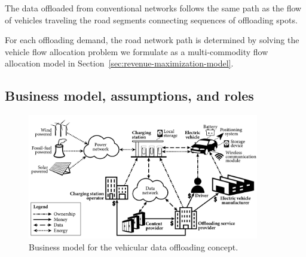 
The data offloaded from conventional networks follows the same path as the flow of vehicles traveling the road segments connecting sequences of offloading spots. 

For each offloading demand, the road network path is determined by solving the vehicle flow allocation problem we formulate as a multi-commodity flow allocation model in Section~\ref{sec:revenue-maximization-model}.




\subsection{Business model, assumptions, and roles}
\label{sec:business-model}

\begin{figure}[h!]
    \centering
    \includegraphics[width=0.9\textwidth]{figures/business-plan.pdf}
    \caption{Business model for the vehicular data offloading concept.}
    \label{fig:business-model}
\end{figure}

